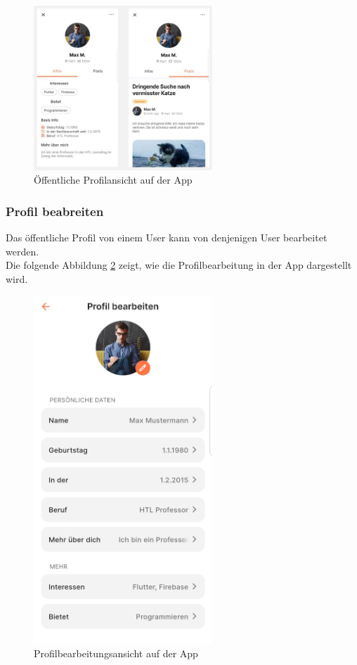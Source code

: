 \begin{figure}[H]
  \centering
  \includegraphics[width=0.6\textwidth]{pics/public-profile.JPG}
  \caption{Öffentliche Profilansicht auf der App}
  \label{fig:public-profile}
\end{figure}


\subsubsection{Profil beabreiten}

Das öffentliche Profil von einem User kann von denjenigen User bearbeitet werden.
\\
Die folgende Abbildung \ref{fig:edit-profile} zeigt, wie die Profilbearbeitung in der App dargestellt wird.

\begin{figure}[H]
  \centering
  \includegraphics[width=0.6\textwidth]{pics/edit-profile.jpg}
  \caption{Profilbearbeitungsansicht auf der App}
  \label{fig:edit-profile}
\end{figure}


